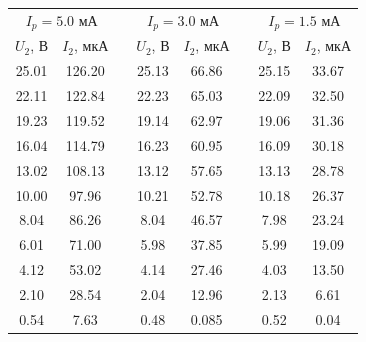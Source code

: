 \documentclass[12pt,a4paper]{scrartcl}
\begin{document}
\begin{table}[h]
\centering
\begin{tabular}{|c|c|c|c|c|c|c|c|}
\cline{1-2} \cline{4-5} \cline{7-8}
\multicolumn{2}{|c|}{$I_p = 5.0$ мА} &  & \multicolumn{2}{c|}{$I_p = 3.0$ мА} &  & \multicolumn{2}{c|}{$I_p = 1.5$ мА} \\ \cline{1-2} \cline{4-5} \cline{7-8} 
$U_2$, В          & $I_2$, мкА        &  & $U_2$, В         & $I_2$, мкА        &  & $U_2$, В          & $I_2$, мкА         \\ \cline{1-2} \cline{4-5} \cline{7-8} 
25.01          & 126.20          &  & 25.13         & 66.86          &  & 25.15          & 33.67           \\ \cline{1-2} \cline{4-5} \cline{7-8} 
22.11          & 122.84         &  & 22.23         & 65.03          &  & 22.09          & 32.50           \\ \cline{1-2} \cline{4-5} \cline{7-8} 
19.23          & 119.52         &  & 19.14         & 62.97          &  & 19.06          & 31.36           \\ \cline{1-2} \cline{4-5} \cline{7-8} 
16.04          & 114.79         &  & 16.23         & 60.95          &  & 16.09          & 30.18           \\ \cline{1-2} \cline{4-5} \cline{7-8} 
13.02          & 108.13         &  & 13.12         & 57.65          &  & 13.13          & 28.78           \\ \cline{1-2} \cline{4-5} \cline{7-8} 
10.00          & 97.96          &  & 10.21         & 52.78          &  & 10.18          & 26.37           \\ \cline{1-2} \cline{4-5} \cline{7-8} 
8.04           & 86.26          &  & 8.04          & 46.57          &  & 7.98           & 23.24           \\ \cline{1-2} \cline{4-5} \cline{7-8} 
6.01           & 71.00          &  & 5.98          & 37.85          &  & 5.99           & 19.09           \\ \cline{1-2} \cline{4-5} \cline{7-8} 
4.12           & 53.02          &  & 4.14          & 27.46          &  & 4.03           & 13.50           \\ \cline{1-2} \cline{4-5} \cline{7-8} 
2.10           & 28.54          &  & 2.04          & 12.96          &  & 2.13           & 6.61            \\ \cline{1-2} \cline{4-5} \cline{7-8} 
0.54           & 7.63           &  & 0.48          & 0.085          &  & 0.52           & 0.04            \\ \cline{1-2} \cline{4-5} \cline{7-8} 

\end{tabular}
\end{table}
\end{document}
